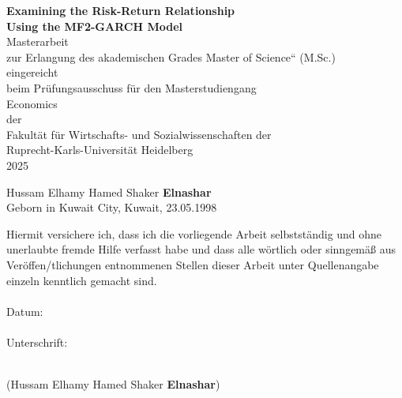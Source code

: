 \documentclass[12pt]{article}
\begin{document}
\renewcommand*\contentsname{Table of Contents}

\thispagestyle{empty}
\hspace{0pt}
\begin{center}
\vfill
\textbf{Examining the Risk-Return Relationship \\Using the MF2-GARCH Model}\\
\vspace{25mm}
Masterarbeit\\
zur Erlangung des akademischen Grades  Master of Science“ (M.Sc.)\\
\vspace{5mm}
eingereicht\\
beim Prüfungsausschuss für den Masterstudiengang\\
\vspace{5mm}
Economics\\
\vspace{5mm}
der\\
Fakultät für Wirtschafts- und Sozialwissenschaften der\\
Ruprecht-Karls-Universität Heidelberg\\
\vspace{5mm}
2025
\vspace{5mm}
\end{center}
\vfill
Hussam Elhamy Hamed Shaker \textbf{Elnashar}\\
Geborn in Kuwait City, Kuwait, 23.05.1998
\hspace{0pt}

\newpage
\thispagestyle{empty}
\noindent Hiermit versichere ich, dass ich die vorliegende Arbeit selbstständig und ohne unerlaubte fremde Hilfe verfasst habe und dass alle wörtlich oder sinngemäß aus Veröffen\-/tlichungen entnommenen Stellen dieser Arbeit unter Quellenangabe einzeln kenntlich gemacht sind.\\\\
Datum:\\\\
Unterschrift:\\\\
\begin{center}
(Hussam Elhamy Hamed Shaker \textbf{Elnashar})
\end{center}

\newpage
\thispagestyle{empty}
\tableofcontents
\thispagestyle{empty}

\newpage
{}
\setcounter{page}{1}
\end{document}
